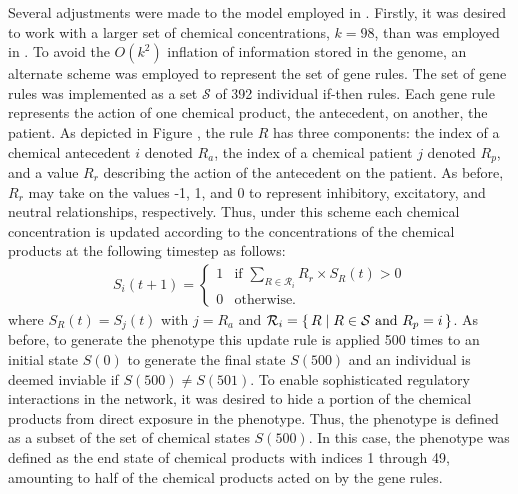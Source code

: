 Several adjustments were made to the model employed in \cite{Wilder2015ReconcilingEvolvability}.
Firstly, it was desired to work with a larger set of chemical concentrations, $k=98$,  than was employed in \cite{Wilder2015ReconcilingEvolvability}.
To avoid the $O(k^2)$ inflation of information stored in the genome, an alternate scheme was employed to represent the set of gene rules.
The set of gene rules was implemented as a set $\mathcal{S}$ of 392 individual if-then rules.
Each gene rule represents the action of one chemical product, the antecedent, on another, the patient.
As depicted in Figure , the rule $R$ has three components: the index of a chemical antecedent $i$ denoted $R_a$, the index of a chemical patient $j$ denoted $R_p$, and a value $R_r$ describing the action of the antecedent on the patient.
As before, $R_r$ may take on the values -1, 1, and 0 to represent inhibitory, excitatory, and neutral relationships, respectively.
Thus, under this scheme each chemical concentration is updated according to the concentrations of the chemical products at the following timestep as follows:
\begin{align*}
S_i(t+1) = 
\begin{cases}
1 & \text{if } \sum_{R \in \mathcal{R}_i} R_r \times S_R(t) > 0 \\
0 & \text{otherwise.}
\end{cases}
\end{align*}
where $S_R(t) = S_j(t)$ with $j = R_a$ and $\mathcal{R}_i = \{\,R\mid R \in \mathcal{S} \text{ and } R_p = i\,\}$.
As before, to generate the phenotype this update rule is applied 500 times to an initial state $S(0)$ to generate the final state $S(500)$ and an individual is deemed inviable if $S(500) \neq S(501)$.
To enable sophisticated regulatory interactions in the network, it was desired to hide a portion of the chemical products from direct exposure in the phenotype.
Thus, the phenotype is defined as a subset of the set of chemical states $S(500)$.
In this case, the phenotype was defined as the end state of chemical products with indices 1 through 49, amounting to half of the chemical products acted on by the gene rules.

